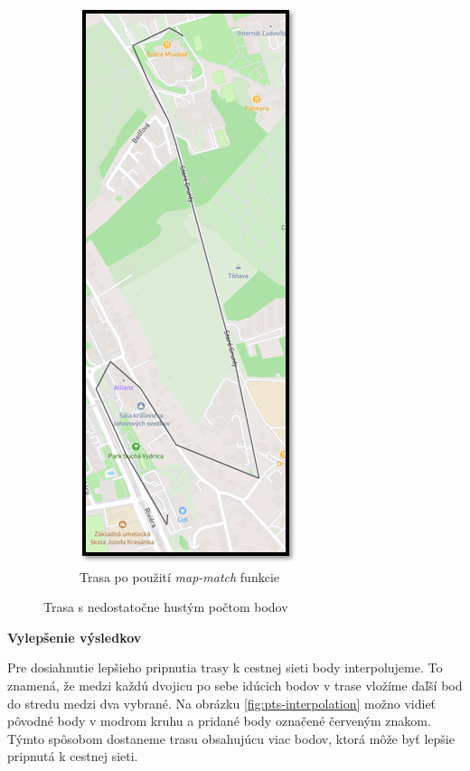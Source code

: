\begin{figure}[H]
\begin{subfigure}{0.45\textwidth}
        \centering
        \includegraphics[width=.5\textwidth]{img/map-match rozdiel/malo bodov po.png}
        \caption{Trasa po použití \textit{map-match} funkcie}
        \label{fig:map-match-low-points-after}
    \end{subfigure}
    \caption{Trasa s nedostatočne hustým počtom bodov}
    \label{fig:map-match-low-points}
\end{figure}

\noindent\textbf{Vylepšenie výsledkov}

Pre dosiahnutie lepšieho pripnutia trasy k cestnej sieti body interpolujeme. To znamená, že medzi každú dvojicu po sebe idúcich bodov v trase vložíme ďaľší bod do stredu medzi dva vybrané. Na obrázku \ref{fig:pts-interpolation} možno vidieť pôvodné body v modrom kruhu a pridané body označené červeným znakom. Týmto spôsobom dostaneme trasu obsahujúcu viac bodov, ktorá môže byť lepšie pripnutá k cestnej sieti.  

